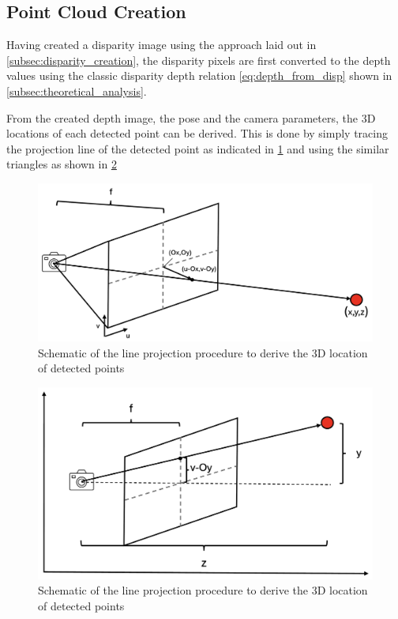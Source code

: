 \subsection{Point Cloud Creation}

Having created a disparity image using the approach laid out in \cref{subsec:disparity_creation}, the disparity pixels are first converted to the depth values using the classic disparity depth relation \ref{eq:depth_from_disp} shown in \cref{subsec:theoretical_analysis}.


From the created depth image, the pose and the camera parameters, the 3D locations of each detected point can be derived. This is done by simply tracing the projection line of the detected point as indicated in \cref{fig:line_projection} and using the similar triangles as shown in \cref{fig:similar_triangles}

\begin{figure}[h]
\centering
\includegraphics[scale=0.35]{images/stereo_camera_depth/projection.png}
\caption{Schematic of the line projection procedure to derive the 3D location of detected points}
\label{fig:line_projection}
\end{figure}

\begin{figure}[h]
\centering
\includegraphics[scale=0.35]{images/stereo_camera_depth/similar_triangles.png}
\caption{Schematic of the line projection procedure to derive the 3D location of detected points}
\label{fig:similar_triangles}
\end{figure}


